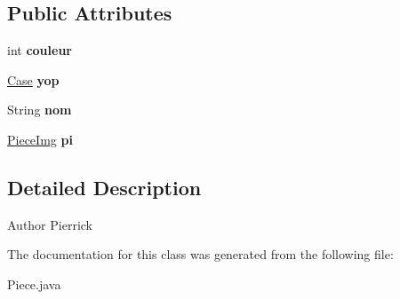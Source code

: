 \subsection*{Public Attributes}
\begin{DoxyCompactItemize}
\item 
int {\bfseries couleur}\hypertarget{class_piece_ad20c514044b4f915f6632e16a6650481}{}\label{class_piece_ad20c514044b4f915f6632e16a6650481}

\item 
\hyperlink{class_case}{Case} {\bfseries yop}\hypertarget{class_piece_ab50473158b8d3fcba018f3a759d335f5}{}\label{class_piece_ab50473158b8d3fcba018f3a759d335f5}

\item 
String {\bfseries nom}\hypertarget{class_piece_ac45bccda0ddc8fba99cbfcdc1e2d252b}{}\label{class_piece_ac45bccda0ddc8fba99cbfcdc1e2d252b}

\item 
\hyperlink{class_piece_img}{Piece\+Img} {\bfseries pi}\hypertarget{class_piece_a62067ca330d854d5b75fdb85c7628c76}{}\label{class_piece_a62067ca330d854d5b75fdb85c7628c76}

\end{DoxyCompactItemize}


\subsection{Detailed Description}
\begin{DoxyAuthor}{Author}
Pierrick 
\end{DoxyAuthor}


The documentation for this class was generated from the following file\+:\begin{DoxyCompactItemize}
\item 
Piece.\+java\end{DoxyCompactItemize}
